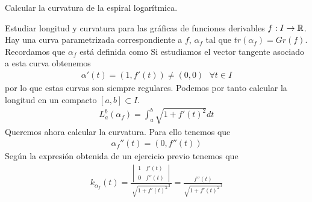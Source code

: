 \begin{ejercicio}
    Calcular la curvatura de la espiral logarítmica.
\end{ejercicio}

\begin{ejercicio}
    Estudiar longitud y curvatura para las gráficas de funciones derivables $f: I \to \mathbb{R}$.\\

    Hay una curva parametrizada correspondiente a $f$, $\alpha_f$ tal que $tr(\alpha_f) = Gr(f)$. Recordamos que $\alpha_f$ está definida como
    Si estudiamos el vector tangente asociado a esta curva obtenemos
    \begin{gather*}
        \alpha'(t) = (1,f'(t)) \neq (0,0) \ \ \ \forall t\in I
    \end{gather*}
    por lo que estas curvas son siempre regulares. Podemos por tanto calcular la longitud en un compacto $[a,b]\subset I$.
    \begin{gather*}
        L_a^b(\alpha_f) = \int_a^b \sqrt{1+f'(t)^2} dt
    \end{gather*}
    Queremos ahora calcular la curvatura. Para ello tenemos que 
    \begin{gather*}
        \alpha_f''(t) = (0,f''(t))
    \end{gather*}
    Según la expresión obtenida de un ejercicio previo tenemos que 
    \begin{gather*}
        k_{\alpha_f}(t) = \frac{\begin{vmatrix}
            1 & f'(t) \\ 0 & f''(t)
        \end{vmatrix}}{\sqrt{1+f'(t)^2}^3} = \frac{f''(t)}{\sqrt{1+f'(t)^2}^3}
    \end{gather*}
\end{ejercicio}

